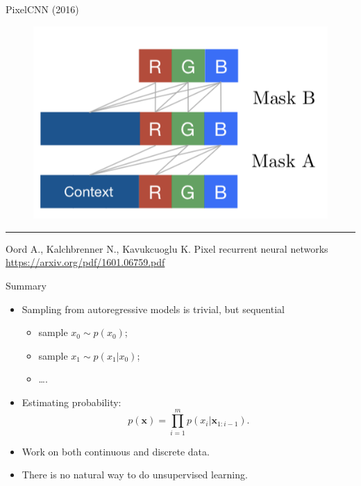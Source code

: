 \documentclass{beamer}
\newcommand{\bx}{\mathbf{x}}
\begin{document}
\begin{frame}{PixelCNN (2016)}
\begin{minipage}[t]{0.5\columnwidth}
\begin{figure}[h]
	\end{figure}
	\vspace{-0.4cm}
	\begin{figure}
		\centering
        \includegraphics[width=0.65\linewidth]{figs/pixelcnn2.png}
	\end{figure}
\end{minipage}
\vfill
\hrule\medskip
{\scriptsize Oord A., Kalchbrenner N., Kavukcuoglu K. Pixel recurrent neural networks \href{https://arxiv.org/pdf/1601.06759.pdf}{https://arxiv.org/pdf/1601.06759.pdf}}
\end{frame}
\begin{frame}{Summary}
    \begin{itemize}
        \item Sampling from autoregressive models is trivial, but sequential
        \begin{itemize}
            \item sample $x_0 \sim p(x_0)$;
            \item sample $x_1 \sim p(x_1 | x_0)$;
            \item \dots.
        \end{itemize}
        \item Estimating probability:
        \[
            p(\bx) = \prod_{i=1}^m p(x_i | \bx_{1:i - 1}).
        \]
        \item Work on both continuous and discrete data.
        \item There is no natural way to do unsupervised learning.
    \end{itemize}
\end{frame}
\end{document}
